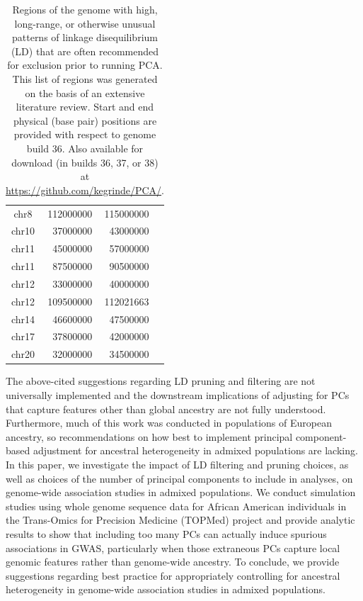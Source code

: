 \documentclass[12pt]{article}
\begin{document}
\begin{table}
\begin{tabular}{crrl}
chr8   & 112000000    &   115000000    &   \citep{anderson2010, price2008, weale2010} \\
chr10  &  37000000    &    43000000   &    \citep{anderson2010, price2008, weale2010}  \\
chr11   & 45000000    &    57000000   &    \citep{fellay2007, price2008, weale2010} \\
chr11   & 87500000    &    90500000   &    \citep{anderson2010, price2008, weale2010}  \\
chr12   & 33000000    &    40000000   &    \citep{anderson2010, price2008, weale2010} \\
chr12   & 109500000   &    112021663   &    \citep{price2008, weale2010} \\
chr14   & 46600000    &    47500000   &    \citep{prive2018} \\
chr17   & 37800000    &    42000000    &   \citep{novembre2008, conomos2016} \\
chr20   & 32000000   &     34500000    &   \citep{anderson2010, price2008, weale2010}  \\
\end{tabular}
\caption{Regions of the genome with high, long-range, or otherwise unusual patterns of linkage disequilibrium (LD) that are often recommended for exclusion prior to running PCA. This list of regions was generated on the basis of an extensive literature review. Start and end physical (base pair) positions are provided with respect to genome build 36. Also available for download (in builds 36, 37, or 38) at \href{github.com/kegrinde/PCA}{https://github.com/kegrinde/PCA/}.}
\end{table}


The above-cited suggestions regarding LD pruning and filtering are not universally implemented and the downstream implications of adjusting for PCs that capture features other than global ancestry are not fully understood.
Furthermore, much of this work was conducted in populations of European ancestry, so recommendations on how best to implement principal component-based adjustment for ancestral heterogeneity in admixed populations are lacking. 
In this paper, we investigate the impact of LD filtering and pruning choices, as well as choices of the number of principal components to include in analyses, on genome-wide association studies in admixed populations.
We conduct simulation studies using whole genome sequence data for African American individuals in the Trans-Omics for Precision Medicine (TOPMed) project and provide analytic results to show that including too many PCs can actually induce spurious associations in GWAS, particularly when those extraneous PCs capture local genomic features rather than genome-wide ancestry.  
To conclude, we provide suggestions regarding best practice for appropriately controlling for ancestral heterogeneity in genome-wide association studies in admixed populations.
\end{document}
